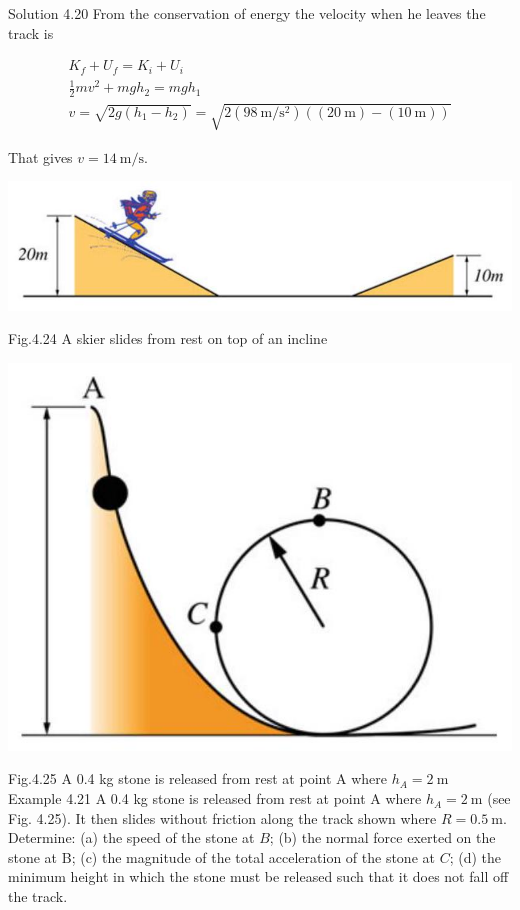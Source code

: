 \documentclass[10pt]{article}
\begin{document}
Solution 4.20 From the conservation of energy the velocity when he leaves the track is

$$
\begin{gathered}
K_{f}+U_{f}=K_{i}+U_{i} \\
\frac{1}{2} m v^{2}+m g h_{2}=m g h_{1} \\
v=\sqrt{2 g\left(h_{1}-h_{2}\right)}=\sqrt{2\left(98 \mathrm{~m} / \mathrm{s}^{2}\right)((20 \mathrm{~m})-(10 \mathrm{~m}))}
\end{gathered}
$$

That gives $v=14 \mathrm{~m} / \mathrm{s}$.

\begin{center}
\includegraphics[max width=\textwidth]{2024_09_13_db1f357d2aad0a03eb2eg-076}
\end{center}

Fig.4.24 A skier slides from rest on top of an incline

\begin{center}
\includegraphics[max width=\textwidth]{2024_09_13_db1f357d2aad0a03eb2eg-076(1)}
\end{center}

Fig.4.25 A 0.4 kg stone is released from rest at point A where $h_{A}=2 \mathrm{~m}$\\
Example 4.21 A 0.4 kg stone is released from rest at point A where $h_{A}=2 \mathrm{~m}$ (see Fig. 4.25). It then slides without friction along the track shown where $R=0.5 \mathrm{~m}$. Determine: (a) the speed of the stone at $B$; (b) the normal force exerted on the stone at B; (c) the magnitude of the total acceleration of the stone at $C$; (d) the minimum height in which the stone must be released such that it does not fall off the track.
\end{document}
